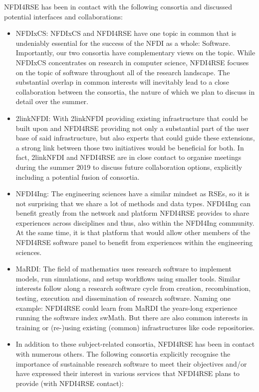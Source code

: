 \documentclass[11pt,a4paper,DIV=11]{scrlttr2}
\begin{document}
\begin{letter}{}
NFDI4RSE has been in contact with the following consortia and discussed potential interfaces and collaborations:
\begin{itemize}
 \setlength\itemsep{0em}
\item NFDIxCS: NFDIxCS and NFDI4RSE have one topic in common that is undeniably essential for the success of the NFDI as a whole: Software. Importantly, our two consortia have complementary views on the topic. While NFDIxCS concentrates on research in computer science, NFDI4RSE focuses on the topic of software throughout all of the research landscape. The substantial overlap in common interests will inevitably lead to a close collaboration between the consortia, the nature of which we plan to discuss in detail over the summer. 
\item 2linkNFDI: With 2linkNFDI providing existing infrastructure that could be built upon and NFDI4RSE providing not only a substantial part of the user base of said infrastructure, but also experts that could guide these extensions, a strong link between those two initiatives would be beneficial for both. In fact, 2linkNFDI and NFDI4RSE are in close contact to organise meetings during the summer 2019 to discuss future collaboration options, explicitly including a potential fusion of consortia.
\item NFDI4Ing: The engineering sciences have a similar mindset as RSEs, so it is not surprising that we share a lot of methods and data types. NFDI4Ing can benefit greatly from the network and platform NFDI4RSE provides to share experiences across disciplines and thus, also within the NFDI4Ing community. At the same time, it is that platform that would allow other members of the NFDI4RSE software panel to benefit from experiences within the engineering sciences.
\item MaRDI: The field of mathematics uses research software to implement models, run simulations, and setup workflows using smaller tools. Similar interests follow along a research software cycle from creation, recombination, testing, execution and dissemination of research software. Naming one example: NFDI4RSE could learn from MaRDI the years-long experience running the software index swMath. But there are also common interests in training or (re-)using existing (common) infrastructures like code repositories. 
\item In addition to these subject-related consortia, NFDI4RSE has been in contact with numerous others. The following consortia explicitly recognise the importance of sustainable research software to meet their objectives and/or have expressed their interest in various services that NFDI4RSE plans to provide (with NFDI4RSE contact):

\end{itemize}
\end{letter}
\end{document}
